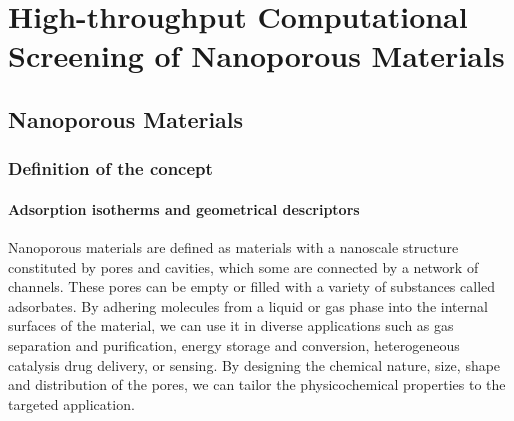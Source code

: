 \documentclass[main.tex]{subfiles}
\begin{document}
\chapter{High-throughput Computational Screening of Nanoporous Materials}
\vspace*{-1\baselineskip}

\section{Nanoporous Materials}

\subsection{Definition of the concept}

\subsubsection{Adsorption isotherms and geometrical descriptors}

Nanoporous materials are defined as materials with a nanoscale structure constituted by pores and cavities, which some are connected by a network of channels. These pores can be empty or filled with a variety of substances called adsorbates. By adhering molecules from a liquid or gas phase into the internal surfaces of the material, we can use it in diverse applications such as gas separation and purification,\autocite{Li_2009,Lagorsse_2007} energy storage and conversion,\autocite{Morris_2008,Qiu_2020} heterogeneous catalysis\autocite{Bell_2003,Singh_2019,Pascanu_2019} drug delivery,\autocite{Della_Rocca_2011,Bernini_2014} or sensing.\autocite{Breslin_1976} By designing the chemical nature, size, shape and distribution of the pores, we can tailor the physicochemical properties to the targeted application.\autocite{Yan_2020}
\end{document}
